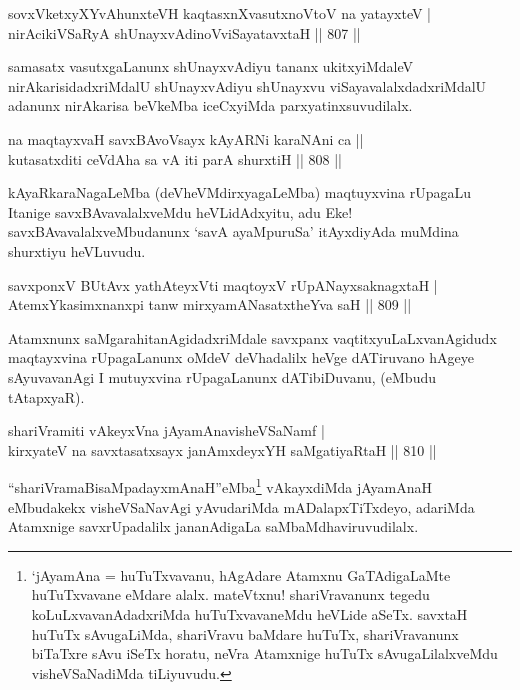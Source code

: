 \begin{shl}
sovxVketxyXYvAhunxteVH kaqtasxnXvasutxnoV\s toV na yatayxteV | \\
nirAcikiVSaRyA shUnayxvAdinoV\s viSayatavxtaH \hfill||  807 ||  
\end{shl}

\begin{artha}
samasatx vasutxgaLanunx shUnayxvAdiyu tananx ukitxyiMdaleV nirAkarisidadxriMdalU shUnayxvAdiyu shUnayxvu viSayavalalxdadxriMdalU adanunx nirAkarisa beVkeMba iceCxyiMda parxyatinxsuvudilalx.
\end{artha}


\begin{shl}
na maqtayxvaH savxBAvoV\s sayx kAyARNi karaNAni ca ||  \\
kutasatxditi ceVdAha sa vA iti parA shurxtiH \hfill||  808 ||  
\end{shl}

\begin{artha}
kAyaRkaraNagaLeMba (deVheVMdirxyagaLeMba) maqtuyxvina rUpagaLu Itanige savxBAvavalalxveMdu heVLidAdxyitu, adu Eke! savxBAvavalalxveMbudanunx `savA ayaMpuruSa' itAyxdiyAda muMdina shurxtiyu heVLuvudu.
\end{artha}


\begin{shl}
savxponxV BUtAvx yathA\s teyxVti maqtoyxV rUpANayxsaknagxtaH | \\
AtemxYkasimxnanxpi tanw mirxyamANasatxtheYva saH \hfill||  809 ||  
\end{shl}

\begin{artha}
Atamxnunx saMgarahitanAgidadxriMdale savxpanx vaqtitxyuLaLxvanAgidudx maqtayxvina rUpagaLanunx oMdeV deVhadalilx heVge dATiruvano hAgeye sAyuvavanAgi I mutuyxvina rUpagaLanunx dATibiDuvanu, (eMbudu tAtapxyaR).
\end{artha}

\begin{shl}
shariVramiti vAkeyxVna jAyamAnavisheVSaNamf | \\
kirxyateV na savxtasatxsayx janAmxdeyxYH saMgatiyaRtaH \hfill||  810 ||  
\end{shl}

\begin{artha}
``shariVramaBisaMpadayxmAnaH''eMba\footnote{`jAyamAna = huTuTxvavanu, hAgAdare Atamxnu GaTAdigaLaMte huTuTxvavane eMdare alalx. mateVtxnu! shariVravanunx tegedu koLuLxvavanAdadxriMda huTuTxvavaneMdu heVLide aSeTx. savxtaH huTuTx sAvugaLiMda, shariVravu baMdare huTuTx, shariVravanunx biTaTxre sAvu iSeTx horatu, neVra Atamxnige huTuTx sAvugaLilalxveMdu visheVSaNadiMda tiLiyuvudu.} vAkayxdiMda jAyamAnaH eMbudakekx visheVSaNavAgi yAvudariMda mADalapxTiTxdeyo, adariMda Atamxnige savxrUpadalilx jananAdigaLa saMbaMdhaviruvudilalx.
\end{artha}

